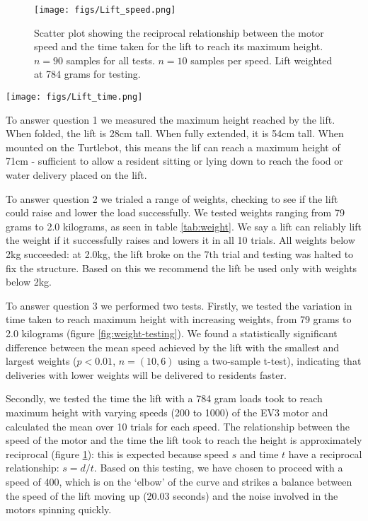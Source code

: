 \documentclass{article}
\begin{document}
\begin{figure}
  \begin{center}
    \texttt{[image: figs/Lift\_speed.png]}
    \caption{Scatter plot showing the reciprocal relationship between the motor speed and the time taken for the lift to reach its maximum height. $n = 90$ samples for all tests. $n = 10$ samples per speed. Lift weighted at 784 grams for testing.}
  \label{fig:speed-testing}
  \end{center}
\end{figure}

\begin{figure*}
  \begin{center}
    \texttt{[image: figs/Lift\_time.png]}
    \caption{Box plots of the time taken for the lift to reach its maximum height with increasing weights. $n = 66$ samples for all tests. $n = 10$ samples per weight except at 2.034kg with $n = 6$.}
    \label{fig:weight-testing}
  \end{center}
\end{figure*}

To answer question 1 we measured the maximum height reached by the lift. When folded, the lift is 28cm tall. When fully extended, it is 54cm tall. When mounted on the Turtlebot, this means the lif can reach a maximum height of 71cm - sufficient to allow a resident sitting or lying down to reach the food or water delivery placed on the lift.

To answer question 2 we trialed a range of weights, checking to see if the lift could raise and lower the load successfully. We tested weights ranging from 79 grams to 2.0 kilograms, as seen in table \ref{tab:weight}. We say a lift can reliably lift the weight if it successfully raises and lowers it in all 10 trials. All weights below 2kg succeeded: at 2.0kg, the lift broke on the 7th trial and testing was halted to fix the structure. Based on this we recommend the lift be used only with weights below 2kg.

To answer question 3 we performed two tests. Firstly, we tested the variation in time taken to reach maximum height with increasing weights, from 79 grams to 2.0 kilograms (figure \ref{fig:weight-testing}). We found a statistically significant difference between the mean speed achieved by the lift with the smallest and largest weights ($p < 0.01$, $n = (10, 6)$ using a two-sample t-test), indicating that deliveries with lower weights will be delivered to residents faster. 

Secondly, we tested the time the lift with a 784 gram loads took to reach maximum height with varying speeds (200 to 1000) of the EV3 motor and calculated the mean over 10 trials for each speed. The relationship between the speed of the motor and the time the lift took to reach the height is approximately reciprocal (figure \ref{fig:speed-testing}): this is expected because speed $s$ and time $t$ have a reciprocal relationship: $s = d / t$. Based on this testing, we have chosen to proceed with a speed of 400, which is on the `elbow' of the curve and strikes a balance between the speed of the lift moving up (20.03 seconds) and the noise involved in the motors spinning quickly.
\end{document}
